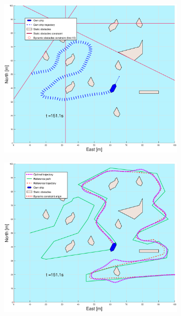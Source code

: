 \begin{figure}[ht]\ContinuedFloat
    \begin{subfigure}[b]{0.49\textwidth}
        \centering
        \includegraphics[width=\textwidth]{Images/Figures/skjergard_u_trafikk/_Simple_1fig1_time=151}
    \end{subfigure}
    \hfill
    \begin{subfigure}[b]{0.499\textwidth}
        \centering
        \includegraphics[width=\textwidth]{Images/Figures/skjergard_u_trafikk/_Simple_1fig999_time=151}

\end{subfigure}
\end{figure}
